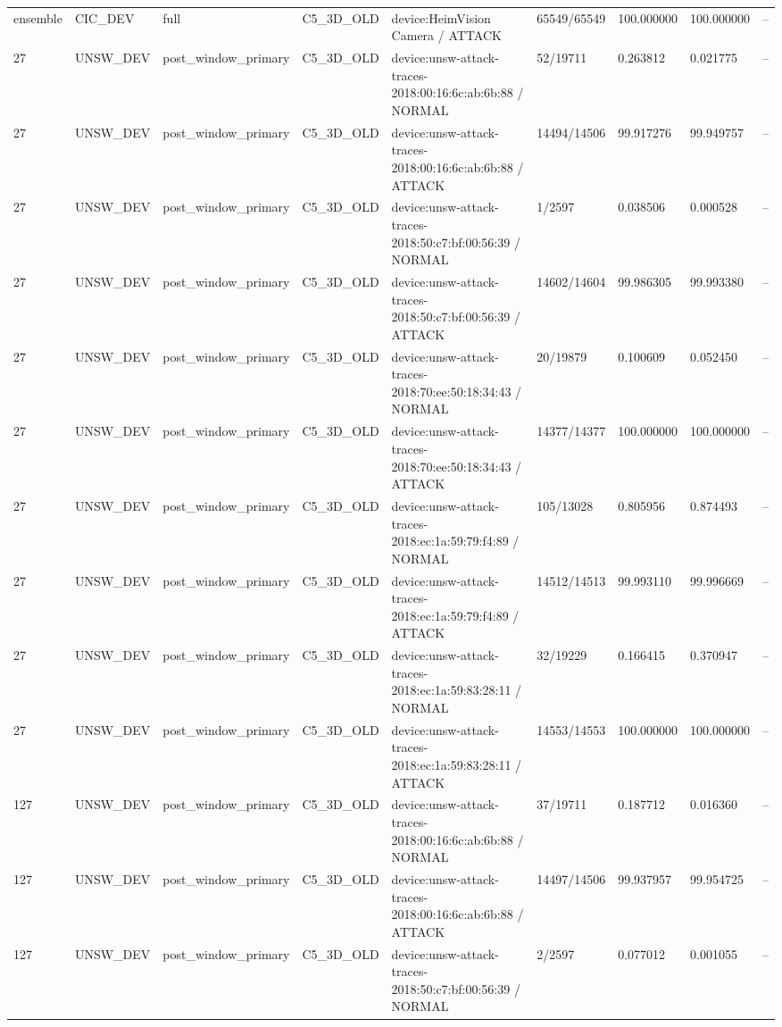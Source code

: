 \begin{tabular}{lllllllll}
ensemble & CIC\_DEV & full & C5\_3D\_OLD & device:HeimVision Camera / ATTACK & 65549/65549 & 100.000000 & 100.000000 & -- \\
27 & UNSW\_DEV & post\_window\_primary & C5\_3D\_OLD & device:unsw-attack-traces-2018:00:16:6c:ab:6b:88 / NORMAL & 52/19711 & 0.263812 & 0.021775 & -- \\
27 & UNSW\_DEV & post\_window\_primary & C5\_3D\_OLD & device:unsw-attack-traces-2018:00:16:6c:ab:6b:88 / ATTACK & 14494/14506 & 99.917276 & 99.949757 & -- \\
27 & UNSW\_DEV & post\_window\_primary & C5\_3D\_OLD & device:unsw-attack-traces-2018:50:c7:bf:00:56:39 / NORMAL & 1/2597 & 0.038506 & 0.000528 & -- \\
27 & UNSW\_DEV & post\_window\_primary & C5\_3D\_OLD & device:unsw-attack-traces-2018:50:c7:bf:00:56:39 / ATTACK & 14602/14604 & 99.986305 & 99.993380 & -- \\
27 & UNSW\_DEV & post\_window\_primary & C5\_3D\_OLD & device:unsw-attack-traces-2018:70:ee:50:18:34:43 / NORMAL & 20/19879 & 0.100609 & 0.052450 & -- \\
27 & UNSW\_DEV & post\_window\_primary & C5\_3D\_OLD & device:unsw-attack-traces-2018:70:ee:50:18:34:43 / ATTACK & 14377/14377 & 100.000000 & 100.000000 & -- \\
27 & UNSW\_DEV & post\_window\_primary & C5\_3D\_OLD & device:unsw-attack-traces-2018:ec:1a:59:79:f4:89 / NORMAL & 105/13028 & 0.805956 & 0.874493 & -- \\
27 & UNSW\_DEV & post\_window\_primary & C5\_3D\_OLD & device:unsw-attack-traces-2018:ec:1a:59:79:f4:89 / ATTACK & 14512/14513 & 99.993110 & 99.996669 & -- \\
27 & UNSW\_DEV & post\_window\_primary & C5\_3D\_OLD & device:unsw-attack-traces-2018:ec:1a:59:83:28:11 / NORMAL & 32/19229 & 0.166415 & 0.370947 & -- \\
27 & UNSW\_DEV & post\_window\_primary & C5\_3D\_OLD & device:unsw-attack-traces-2018:ec:1a:59:83:28:11 / ATTACK & 14553/14553 & 100.000000 & 100.000000 & -- \\
127 & UNSW\_DEV & post\_window\_primary & C5\_3D\_OLD & device:unsw-attack-traces-2018:00:16:6c:ab:6b:88 / NORMAL & 37/19711 & 0.187712 & 0.016360 & -- \\
127 & UNSW\_DEV & post\_window\_primary & C5\_3D\_OLD & device:unsw-attack-traces-2018:00:16:6c:ab:6b:88 / ATTACK & 14497/14506 & 99.937957 & 99.954725 & -- \\
127 & UNSW\_DEV & post\_window\_primary & C5\_3D\_OLD & device:unsw-attack-traces-2018:50:c7:bf:00:56:39 / NORMAL & 2/2597 & 0.077012 & 0.001055 & -- \\

\end{tabular}
